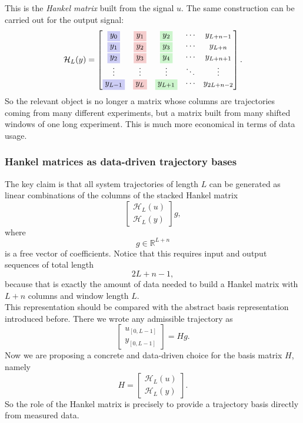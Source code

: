 This is the \emph{Hankel matrix} built from the signal $u$. The same construction can be carried out for the output signal:
\[
\mathcal{H}_L(y)=
\begin{bmatrix}
\colorbox{lightblue}{$\displaystyle y_0$} & \colorbox{lightred}{$\displaystyle y_1$} & \colorbox{lightgreen}{$\displaystyle y_2$} & \cdots & y_{L+n-1}\\
\colorbox{lightblue}{$\displaystyle y_1$} & \colorbox{lightred}{$\displaystyle y_2$} & \colorbox{lightgreen}{$\displaystyle y_3$} & \cdots & y_{L+n}\\
\colorbox{lightblue}{$\displaystyle y_2$} & \colorbox{lightred}{$\displaystyle y_3$} & \colorbox{lightgreen}{$\displaystyle y_4$} & \cdots & y_{L+n+1}\\
\vdots & \vdots & \vdots & \ddots & \vdots\\
\colorbox{lightblue}{$\displaystyle y_{L-1}$} & \colorbox{lightred}{$\displaystyle y_L$} & \colorbox{lightgreen}{$\displaystyle y_{L+1}$} & \cdots & y_{2L+n-2}
\end{bmatrix}.
\]
So the relevant object is no longer a matrix whose columns are trajectories coming from many different experiments, but a matrix built from many shifted windows of one long experiment. This is much more economical in terms of data usage.\\
\subsubsection{Hankel matrices as data-driven trajectory bases}
The key claim is that all system trajectories of length $L$ can be generated as linear combinations of the columns of the stacked Hankel matrix
\[
\begin{bmatrix}
\mathcal{H}_L(u)\\[1mm]
\mathcal{H}_L(y)
\end{bmatrix}g,
\]
where
\[
g\in\mathbb{R}^{L+n}
\]
is a free vector of coefficients. Notice that this requires input and output sequences of total length
\[
2L+n-1,
\]
because that is exactly the amount of data needed to build a Hankel matrix with $L+n$ columns and window length $L$.\\

This representation should be compared with the abstract basis representation introduced before. There we wrote any admissible trajectory as
\[
\begin{bmatrix}
u_{[0,L-1]}\\
y_{[0,L-1]}
\end{bmatrix}
=Hg.
\]
Now we are proposing a concrete and data-driven choice for the basis matrix $H$, namely
\[
H=
\begin{bmatrix}
\mathcal{H}_L(u)\\[1mm]
\mathcal{H}_L(y)
\end{bmatrix}.
\]
So the role of the Hankel matrix is precisely to provide a trajectory basis directly from measured data.\\
